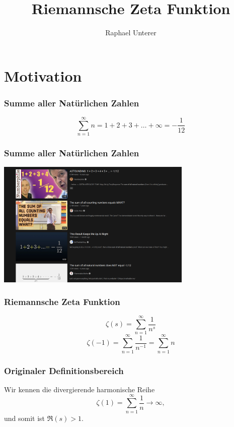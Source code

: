 \documentclass[ngerman, aspectratio=169]{beamer}
\title{Riemannsche Zeta Funktion}
\author{Raphael Unterer}
\institute{Mathematisches Seminar 2022: Spezielle Funktionen}
\begin{document}
	\begin{frame}
		\titlepage
	\end{frame}


	\section{Motivation}

    \begin{frame}
        \frametitle{Summe aller Natürlichen Zahlen}
        \begin{equation*}
            \sum_{n=1}^{\infty} n
            =
            1 + 2 + 3 + \ldots + \infty
            =
            - \frac{1}{12}
        \end{equation*}
    \end{frame}
    \begin{frame}
        \frametitle{Summe aller Natürlichen Zahlen}
        \begin{center}
            \includegraphics[width=0.7\textwidth]{../images/youtube_screenshot.png}
        \end{center}
    \end{frame}
    \begin{frame}
        \frametitle{Riemannsche Zeta Funktion}
        \begin{equation*}
            \zeta(s)
            =
            \sum_{n=1}^{\infty}
            \frac{1}{n^s}
        \end{equation*}
        \pause
        \begin{equation*}
            \zeta(-1)
            =
            \sum_{n=1}^{\infty}
            \frac{1}{n^{-1}}
            =
            \sum_{n=1}^{\infty} n
        \end{equation*}
    \end{frame}
    \begin{frame}
        \frametitle{Originaler Definitionsbereich}
        Wir kennen die divergierende harmonische Reihe
        \begin{equation*}
            \zeta(1)
            =
            \sum_{n=1}^{\infty}
            \frac{1}{n}
            \rightarrow
            \infty,
        \end{equation*}
        und somit ist $\Re(s) > 1$.
    \end{frame}
\end{document}
